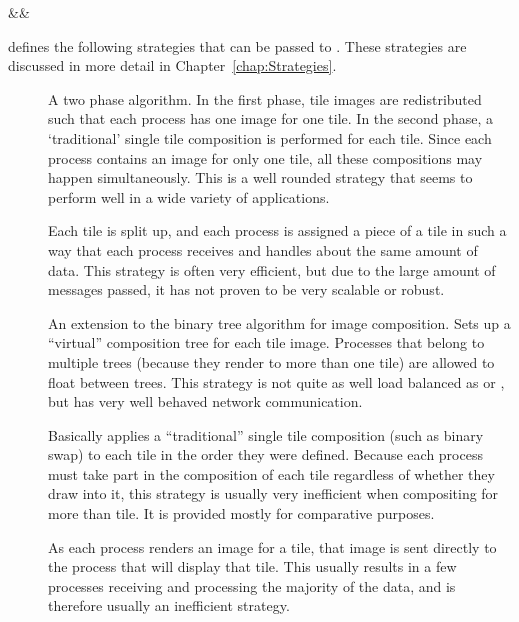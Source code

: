 \begin{Table}{3}
  \textC{(}&&\quad\textC{);}
\end{Table}

\IceT defines the following strategies that can be passed to
.  These strategies are discussed in more detail in
Chapter~\ref{chap:Strategies}.

\begin{description}
\item[]
  A two phase algorithm.  In the first phase, tile images are redistributed
  such that each process has one image for one tile.  In the second phase,
  a `traditional' single tile composition is performed for each tile.
  Since each process contains an image for only one tile, all these
  compositions may happen simultaneously.  This is a well rounded strategy
  that seems to perform well in a wide variety of applications.
\item[] Each tile is
  split up, and each process is assigned a piece of a tile in such a way
  that each process receives and handles about the same amount of data.
  This strategy is often very efficient, but due to the large amount of
  messages passed, it has not proven to be very scalable or robust.
\item[] An
  extension to the binary tree algorithm for image composition.  Sets up a
  ``virtual'' composition tree for each tile image.  Processes that belong
  to multiple trees (because they render to more than one tile) are allowed
  to float between trees.  This strategy is not quite as well load balanced
  as  or , but
  has very well behaved network communication.
\item[] Basically
  applies a ``traditional'' single tile composition (such as binary swap)
  to each tile in the order they were defined.  Because each process must
  take part in the composition of each tile regardless of whether they draw
  into it, this strategy is usually very inefficient when compositing for
  more than tile.  It is provided mostly for comparative purposes.
\item[] As each
  process renders an image for a tile, that image is sent directly to the
  process that will display that tile.  This usually results in a few
  processes receiving and processing the majority of the data, and is
  therefore usually an inefficient strategy.
\end{description}


